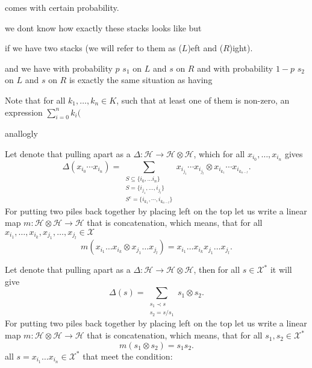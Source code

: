 \documentclass[a4paper]{article}
\begin{document}
 comes with certain probability.
 
 we dont know how exactly these stacks looks 
like but

if we have two stacks (we will refer to them as ($L$)eft and ($R$)ight).

and we have with probability $p$ $s_1$ on $L$ and $s$ on $R$ and with probability $1-p$ $s_2$ on $L$ and 
$s$ on $R$ is exactly the same situation as having 

Note that for all $k_1, \dots, k_n \in K$, such that at least one of them is non-zero, 
an expression $\displaystyle \sum^{n}_{i = 0}k_i ($

anallogly

Let denote that pulling apart as a $\Delta : \mathcal{H} \to \mathcal{H} \otimes \mathcal{H}$, which for all 
$x_{i_0}, \dots, x_{i_n}$ gives
\begin{equation*}
\Delta(x_{i_0}\cdots x_{i_n}) = \sum_{\substack{S \subseteq 
\{ i_0, \dots i_n \} \\ S = \{i_{j_1}, \dots, i_{j_l}\} \\ S^c = \{i_{k_1}, \cdots, i_{k_{n-l}} \}}}
x_{i_{j_1}}\cdots x_{i_{j_l}} \otimes x_{i_{k_1}} \cdots x_{i_{k_{n-l}}}.
\end{equation*}
For putting two piles back together by placing left on the top let us write a linear map 
$m : \mathcal{H} \otimes \mathcal{H} \to \mathcal{H}$ that is concatenation, which means, that 
for all $x_{i_1}, \dots, x_{i_k}, x_{j_1}, \dots, x_{j_l} \in \mathcal{X}$
\begin{equation*}
m(x_{i_1}\dots x_{i_k} \otimes x_{j_1}\dots x_{j_l}) = x_{i_1}\ldots x_{i_k}x_{j_1}\ldots x_{j_l}.
\end{equation*}

Let denote that pulling apart as a $\Delta : \mathcal{H} \to \mathcal{H} \otimes \mathcal{H}$, then for all 
$s \in \mathcal{X}^*$ it will give
\begin{equation*}
\Delta(s) = \sum_{\substack{s_1 \prec s \\ s_2 = s/s_1}}
s_1 \otimes s_2.
\end{equation*}
For putting two piles back together by placing left on the top let us write a linear map 
$m : \mathcal{H} \otimes \mathcal{H} \to \mathcal{H}$ that is concatenation, which means, that 
for all $s_1, s_2 \in \mathcal{X}^*$
\begin{equation*}
m(s_1 \otimes s_2) = s_1s_2.
\end{equation*}
 all $s = x_{i_1}\dots x_{i_n} \in \mathcal{X}^*$ 
that meet the condition: 
\end{document}

